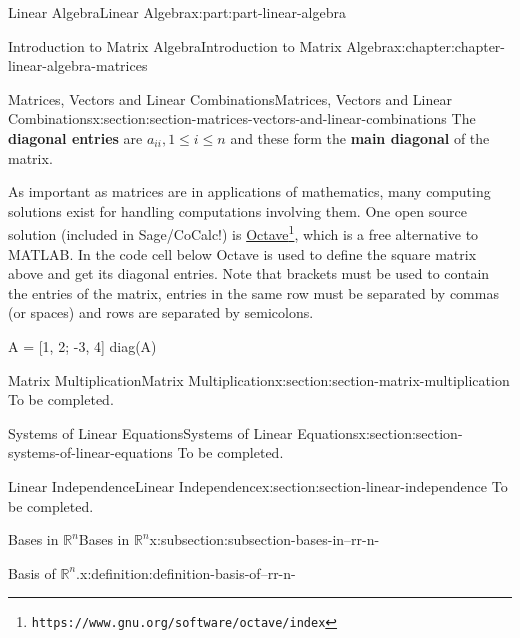 \documentclass[twoside,10pt,]{book}
\newcommand{\terminology}[1]{\textbf{#1}}
\numberwithin{equation}{part}
\newcommand{\RR}{\mathbb{R}}
\begin{document}
\begin{partptx}{Linear Algebra}{}{Linear Algebra}{}{}{x:part:part-linear-algebra}
\begin{chapterptx}{Introduction to Matrix Algebra}{}{Introduction to Matrix Algebra}{}{}{x:chapter:chapter-linear-algebra-matrices}
\begin{sectionptx}{Matrices, Vectors and Linear Combinations}{}{Matrices, Vectors and Linear Combinations}{}{}{x:section:section-matrices-vectors-and-linear-combinations}
The \terminology{diagonal entries} are \(a_{ii},1\leq i\leq n\) and these form the \terminology{main diagonal} of the matrix.%
\par
As important as matrices are in applications of mathematics, many computing solutions exist for handling computations involving them. One open source solution (included in Sage\slash{}CoCalc!) is \href{https://www.gnu.org/software/octave/index}{Octave}\footnote{\nolinkurl{https://www.gnu.org/software/octave/index}\label{g:fn:idm1633061304}}, which is a free alternative to MATLAB. In the code cell below Octave is used to define the square matrix above and get its diagonal entries. Note that brackets must be used to contain the entries of the matrix, entries in the same row must be separated by commas (or spaces) and rows are separated by semicolons.%
\begin{sageinput}
A = [1, 2; -3, 4]
diag(A)
\end{sageinput}
\end{sectionptx}
%
%
\typeout{************************************************}
\typeout{************************************************}
%
\begin{sectionptx}{Matrix Multiplication}{}{Matrix Multiplication}{}{}{x:section:section-matrix-multiplication}
To be completed.%
\end{sectionptx}
%
%
\typeout{************************************************}
\typeout{************************************************}
%
\begin{sectionptx}{Systems of Linear Equations}{}{Systems of Linear Equations}{}{}{x:section:section-systems-of-linear-equations}
To be completed.%
\end{sectionptx}
%
%
\typeout{************************************************}
\typeout{************************************************}
%
\begin{sectionptx}{Linear Independence}{}{Linear Independence}{}{}{x:section:section-linear-independence}
To be completed.%
%
%
\typeout{************************************************}
\typeout{Subsection  Bases in \(\RR^n\)}
\typeout{************************************************}
%
\begin{subsectionptx}{Bases in \(\RR^n\)}{}{Bases in \(\RR^n\)}{}{}{x:subsection:subsection-bases-in--rr-n-}
\begin{definition}{Basis of \(\RR^n\).}{x:definition:definition-basis-of--rr-n-}%

\end{definition}
\end{subsectionptx}
\end{sectionptx}
\end{chapterptx}
\end{partptx}
\end{document}
